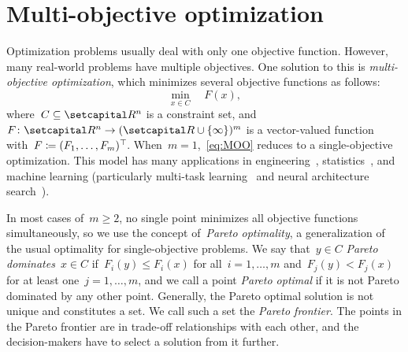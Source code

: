 \documentclass[../../main]{subfiles}
\begin{document}
\section{Multi-objective optimization} \label{sec:intro:multi_objective}
Optimization problems usually deal with only one objective function.
However, many real-world problems have multiple objectives.
One solution to this is \emph{multi-objective optimization}, which minimizes several objective functions as follows:
\[ \label{eq:MOO}
    \min_{x \in C} \quad F(x)
,\] 
where~$C \subseteq \setR^n$ is a constraint set, and $F \colon \setR^n \to (\setR \cup \set{\infty})^m$ is a vector-valued function with~$F \coloneqq (F_1, \dots, F_m)^\top\hspace{-1pt}$.
When~$m = 1$,~\cref{eq:MOO} reduces to a single-objective optimization.
This model has many applications in engineering~\cite{Eschenauer1990}, statistics~\cite{Carrizosa1998}, and machine learning (particularly multi-task learning~\cite{Sener2018,Lin2019} and neural architecture search~\cite{Kim2017,Dong2018,Elsken2019}).

In most cases of~$m \ge 2$, no single point minimizes all objective functions simultaneously, so we use the concept of~\emph{Pareto optimality}, a generalization of the usual optimality for single-objective problems.
We say that~$y \in C$ \emph{Pareto dominates}~$x \in C$ if~$F_i(y) \le F_i(x)$ for all~$i = 1, \dots, m$ and~$F_j(y) < F_j(x)$ for at least one~$j = 1, \dots, m$, and we call a point \emph{Pareto optimal} if it is not Pareto dominated by any other point.
Generally, the Pareto optimal solution is not unique and constitutes a set.
We call such a set the \emph{Pareto frontier}.
The points in the Pareto frontier are in trade-off relationships with each other, and the decision-makers have to select a solution from it further.






\end{document}
